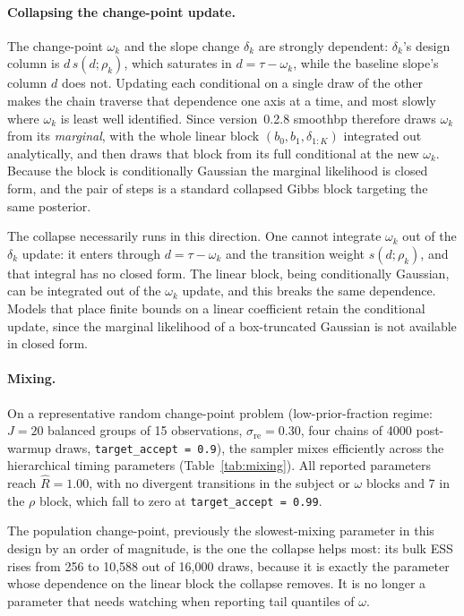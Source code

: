 \documentclass[12pt]{article}
\newcommand{\pkg}[1]{\textsf{#1}}
\newcommand{\code}[1]{\texttt{#1}}
\begin{document}
\paragraph{Collapsing the change-point update.} The change-point $\omega_k$ and the slope change $\delta_k$ are strongly dependent: $\delta_k$'s design column is $d\,s(d;\rho_k)$, which saturates in $d = \tau - \omega_k$, while the baseline slope's column $d$ does not. Updating each conditional on a single draw of the other makes the chain traverse that dependence one axis at a time, and most slowly where $\omega_k$ is least well identified. Since version~0.2.8 \pkg{smoothbp} therefore draws $\omega_k$ from its \emph{marginal}, with the whole linear block $(b_0, b_1, \delta_{1:K})$ integrated out analytically, and then draws that block from its full conditional at the new $\omega_k$. Because the block is conditionally Gaussian the marginal likelihood is closed form, and the pair of steps is a standard collapsed Gibbs block targeting the same posterior.

The collapse necessarily runs in this direction. One cannot integrate $\omega_k$ out of the $\delta_k$ update: it enters through $d = \tau - \omega_k$ and the transition weight $s(d;\rho_k)$, and that integral has no closed form. The linear block, being conditionally Gaussian, can be integrated out of the $\omega_k$ update, and this breaks the same dependence. Models that place finite bounds on a linear coefficient retain the conditional update, since the marginal likelihood of a box-truncated Gaussian is not available in closed form.

\paragraph{Mixing.} On a representative random change-point problem (low-prior-fraction regime: $J = 20$ balanced groups of 15 observations, $\sigma_{\mathrm{re}} = 0.30$, four chains of 4000 post-warmup draws, \code{target\_accept = 0.9}), the sampler mixes efficiently across the hierarchical timing parameters (Table~\ref{tab:mixing}). All reported parameters reach $\widehat{R} = 1.00$, with no divergent transitions in the subject or $\omega$ blocks and 7 in the $\rho$ block, which fall to zero at \code{target\_accept = 0.99}.

The population change-point, previously the slowest-mixing parameter in this design by an order of magnitude, is the one the collapse helps most: its bulk ESS rises from 256 to 10{,}588 out of 16{,}000 draws, because it is exactly the parameter whose dependence on the linear block the collapse removes. It is no longer a parameter that needs watching when reporting tail quantiles of $\omega$.
\end{document}
